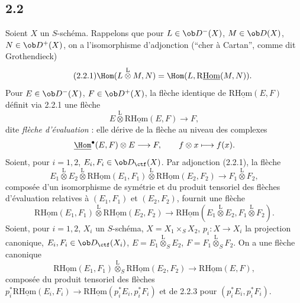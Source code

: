 \subsection*{2.2}
Soient $X$ un $S$-schéma. Rappelons que pour $L\in\ob D^{-}(X)$, $M\in\ob D(X)$, $N\in\ob D^{+}(X)$, on a l'isomorphisme d'adjonction (``cher à Cartan'', comme dit Grothendieck)
\begin{equation}\tag{2.2.1}
\Hom(L\overset{\mathrm{L}}{\otimes}M,N)=\Hom(L,\mathrm{R}\underline{\mathrm{Hom}}(M,N)).
\end{equation}
Pour $E\in\ob D^{-}(X)$, $F\in\ob D^{+}(X)$, la flèche identique de $\mathrm{R}\underline{\mathrm{Hom}}(E,F)$ définit via 2.2.1 une flèche
\begin{equation}\tag{2.2.2}
E\overset{\mathrm{L}}{\otimes}\mathrm{R}\underline{\mathrm{Hom}}(E,F)\longrightarrow F,
\end{equation}
dite \emph{flèche d'évaluation} : elle dérive de la flèche au niveau des complexes
\[
\underline{\Hom}^{\bullet}(E,F)\otimes E\longrightarrow F,
\qquad f\otimes x\longmapsto f(x).
\]
Soient, pour $i=1,2$, $E_i,F_i\in\ob D_{\ctf}(X)$. Par adjonction (2.2.1), la flèche
\[
E_1\overset{\mathrm{L}}{\otimes}E_2\overset{\mathrm{L}}{\otimes}\mathrm{R}\underline{\mathrm{Hom}}(E_1,F_1)\overset{\mathrm{L}}{\otimes}\mathrm{R}\underline{\mathrm{Hom}}(E_2,F_2)\longrightarrow F_1\overset{\mathrm{L}}{\otimes}F_2,
\]
composée d'un isomorphisme de symétrie et du produit tensoriel des flèches d'évaluation relatives à $(E_1,F_1)$ et $(E_2,F_2)$, fournit une flèche
\begin{equation}\tag{2.2.3}
\mathrm{R}\underline{\mathrm{Hom}}(E_1,F_1)\overset{\mathrm{L}}{\otimes}\mathrm{R}\underline{\mathrm{Hom}}(E_2,F_2)\longrightarrow\mathrm{R}\underline{\mathrm{Hom}}(E_1\overset{\mathrm{L}}{\otimes}E_2,F_1\overset{\mathrm{L}}{\otimes}F_2).
\end{equation}
Soient, pour $i=1,2$, $X_i$ un $S$-schéma, $X=X_1\times_SX_2$, $p_i:X\to X_i$ la projection canonique, $E_i,F_i\in\ob D_{\ctf}(X_i)$, $E=E_1\overset{\mathrm{L}}{\otimes}_{S}E_2$, $F=F_1\overset{\mathrm{L}}{\otimes}_{S}F_2$. On a une flèche canonique
\begin{equation}\tag{2.2.4}
\mathrm{R}\underline{\mathrm{Hom}}(E_1,F_1)\overset{\mathrm{L}}{\otimes}_{S}\mathrm{R}\underline{\mathrm{Hom}}(E_2,F_2)\longrightarrow\mathrm{R}\underline{\mathrm{Hom}}(E,F),
\end{equation}
composée du produit tensoriel des flèches $p_i^{*}\mathrm{R}\underline{\mathrm{Hom}}(E_i,F_i)\to\mathrm{R}\underline{\mathrm{Hom}}(p_i^{*}E_i,p_i^{*}F_i)$ et de 2.2.3 pour $(p_i^{*}E_i,p_i^{*}F_i)$.

